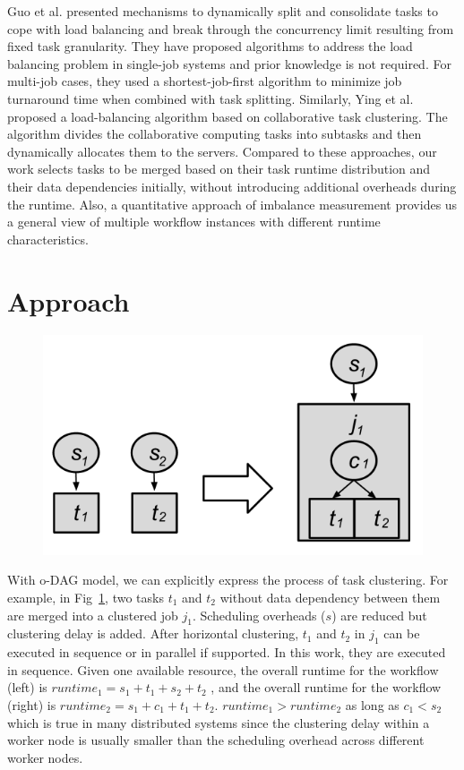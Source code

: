 Guo et al. \cite{Zhenhua2011} presented mechanisms to dynamically split and consolidate tasks to cope with load balancing and break through the concurrency limit resulting from fixed task granularity. They have proposed algorithms to address the load balancing problem in single-job systems and prior knowledge is not required. For multi-job cases, they used a shortest-job-first algorithm to minimize job turnaround time when combined with task splitting. Similarly, Ying et al. \cite{Ying2009} proposed a load-balancing algorithm based on collaborative task clustering. The algorithm divides the collaborative computing tasks into subtasks and then dynamically allocates them to the servers. Compared to these approaches, our work selects tasks to be merged based on their task runtime distribution and their data dependencies initially, without introducing additional overheads during the runtime. Also, a quantitative approach of imbalance measurement provides us a general view of multiple workflow instances with different runtime characteristics. 



\section{Approach}



\begin{figure}[!lh]
\centering

 \includegraphics[width=0.6\linewidth]{figures/balance/hc.png}
  \label{fig:hc}
\end{figure}


With o-DAG model, we can explicitly express the process of task clustering. For example, in Fig~\ref{fig:hc}, two tasks $t_1$ and $t_2$ without data dependency between them are merged into a clustered job $j_1$. Scheduling overheads ($s$) are reduced but clustering delay is added. After horizontal clustering, $t_1$ and $t_2$ in $j_1$ can be executed in sequence or in parallel if supported. In this work, they are executed in sequence. Given one available resource, the overall runtime for the workflow (left) is $runtime_1=s_1+t_1+s_2+t_2$ , and the overall runtime for the workflow (right) is $runtime_2=s_1+c_1+t_1+t_2$.  $runtime_1>runtime_2$ as long as  $c_1<s_2$ which is true in many distributed systems since the clustering delay within a worker node is usually smaller than the scheduling overhead across different worker nodes.  

